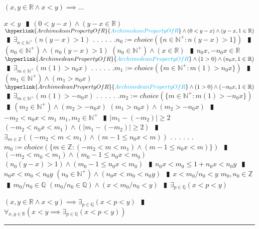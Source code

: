 \documentclass{book}
\newcommand{\rf}[1]{\hyperlink{#1}{\textcolor{cyan}{#1}}}
\newcommand{\abr}{:=}
\newcommand{\cont}{\phantom{.}. . .\phantom{.}}
\newcommand{\pipe}{$\phantom{(}\vrectangleblack\phantom{)}$}
\begin{document}
\begin{enumerate}
  \lit $(x, y \in \mathbb{R} \land x < y) \implies \ldots$
  \begin{enumerate}
    \lit $x < y$ \pipe $(0 < y - x) \land (y - x \in \mathbb{R})$
    \lit $\rf{ArchimedeanPropertyOfR} \land (0 < y - x) \land (y - x, 1 \in \mathbb{R})$ \pipe $\exists_{n \in \mathbb{N}^+}(n (y - x) > 1)$ \cont
    \lit \cont $n_0 \abr choice(\{n \in \mathbb{N}^+ : n (y - x) > 1\})$ \pipe $(n_0 \in \mathbb{N}^+) \land (n_0 (y - x) > 1)$
    \lit $(n_0 \in \mathbb{N}^+) \land (x \in \mathbb{R})$ \pipe $n_0 x, -n_0 x \in \mathbb{R}$
    \lit $\rf{ArchimedeanPropertyOfR} \land (1 > 0) \land (n_0 x, 1 \in \mathbb{\mathbb{R}})$ \pipe $\exists_{m \in \mathbb{N}^+}(m (1) > n_0 x)$ \cont
    \lit \cont $m_1 \abr choice(\{m \in \mathbb{N}^+ : m (1) > n_0 x\})$ \pipe $(m_1 \in \mathbb{N}^+) \land (m_1 > n_0 x)$
    \lit $\rf{ArchimedeanPropertyOfR} \land (1 > 0) \land (-n_0 x, 1 \in \mathbb{\mathbb{R}})$ \pipe $\exists_{m \in \mathbb{N}^+}(m (1) > -n_0 x)$ \cont
    \lit \cont $m_2 \abr choice(\{m \in \mathbb{N}^+ : m (1) > -n_0 x\})$ \pipe $(m_2 \in \mathbb{N}^+) \land (m_2 > -n_0 x)$
    \lit $(m_1 > n_0 x) \land (m_2 > -n_0 x)$ \pipe $-m_2 < n_0 x < m_1$
    \lit $m_1, m_2 \in \mathbb{N}^+$ \pipe $|m_1 - (-m_2)| \geq 2$
    \lit $(-m_2 < n_0 x < m_1) \land (|m_1 - (-m_2)| \geq 2)$ \pipe $\exists_{m \in \mathbb{Z}}((-m_2 < m < m_1) \land (m - 1 \leq n_0 x < m))$ \cont
    \lit \cont $m_0 \abr choice(\{m \in \mathbb{Z} : (-m_2 < m < m_1) \land (m - 1 \leq n_0 x < m)\})$ \pipe $(-m_2 < m_0 < m_1) \land (m_0 - 1 \leq n_0 x < m_0)$
    \lit $(n_0 (y - x) > 1) \land (m_0 - 1 \leq n_0 x < m_0)$ \pipe $n_0 x < m_0 \leq 1 + n_0 x < n_0 y$ \pipe $n_0 x < m_0 < n_0 y$
    \lit $(n_0 \in \mathbb{N}^+) \land (n_0 x < m_0 < n_0 y)$ \pipe $x < m_0 / n_0 < y$
    \lit $m_0, n_0 \in \mathbb{Z}$ \pipe $m_0 / n_0 \in \mathbb{Q}$
    \lit $(m_0 / n_0 \in \mathbb{Q}) \land (x < m_0 / n_0 < y)$ \pipe $\exists_{p \in \mathbb{Q}}(x < p < y)$
  \end{enumerate}
  \lit $(x, y \in \mathbb{R} \land x < y) \implies \exists_{p \in \mathbb{Q}}(x < p < y)$ \pipe $\forall_{x, y \in \mathbb{R}}(x < y \implies \exists_{p \in \mathbb{Q}}(x < p < y))$
\end{enumerate} \vspace{.75mm} \hrule \vspace{.75mm} \ \\ 
\end{document}
